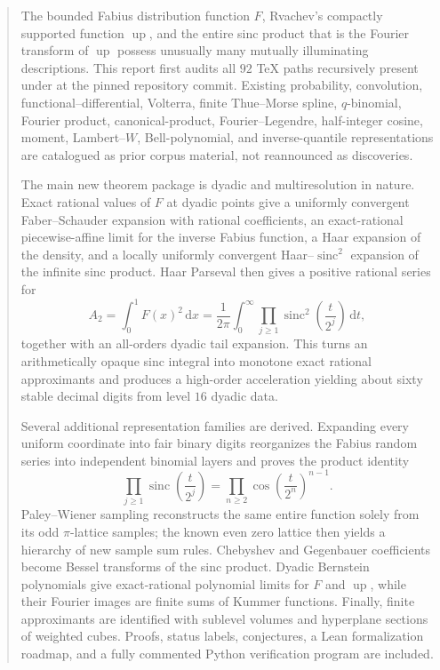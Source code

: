 \documentclass[11pt,oneside]{article}
\theoremstyle{definition}
\newcommand{\dd}{\,\mathrm d}
\newcommand{\Up}{\operatorname{up}}
\newcommand{\sinc}{\operatorname{sinc}}
\begin{document}
\begin{abstract}
The bounded Fabius distribution function $F$, Rvachev's compactly supported
function $\Up$, and the entire sinc product that is the Fourier transform of
$\Up$ possess unusually many mutually illuminating descriptions.  This report
first audits all $92$ TeX paths recursively present under
 at the pinned repository commit.  Existing
probability, convolution, functional--differential, Volterra, finite
Thue--Morse spline, $q$-binomial, Fourier product, canonical-product,
Fourier--Legendre, half-integer cosine, moment, Lambert--$W$, Bell-polynomial,
and inverse-quantile representations are catalogued as prior corpus material,
not reannounced as discoveries.

The main new theorem package is dyadic and multiresolution in nature.  Exact
rational values of $F$ at dyadic points give a uniformly convergent
Faber--Schauder expansion with rational coefficients, an exact-rational
piecewise-affine limit for the inverse Fabius function, a Haar expansion of
the density, and a locally uniformly convergent Haar--$\sinc^2$ expansion of
the infinite sinc product.  Haar Parseval then gives a positive rational series
for
\[
 A_2=\int_0^1F(x)^2\dd x
    =\frac1{2\pi}\int_0^\infty
      \prod_{j\ge1}\sinc^2\!\left(\frac{t}{2^j}\right)\dd t,
\]
together with an all-orders dyadic tail expansion.  This turns an arithmetically
opaque sinc integral into monotone exact rational approximants and produces a
high-order acceleration yielding about sixty stable decimal digits from level
$16$ dyadic data.

Several additional representation families are derived.  Expanding every
uniform coordinate into fair binary digits reorganizes the Fabius random
series into independent binomial layers and proves the product identity
\[
 \prod_{j\ge1}\sinc\!\left(\frac{t}{2^j}\right)
 =\prod_{n\ge2}\cos\!\left(\frac{t}{2^n}\right)^{n-1}.
\]
Paley--Wiener sampling reconstructs the same entire function solely from its
odd $\pi$-lattice samples; the known even zero lattice then yields a hierarchy
of new sample sum rules.  Chebyshev and Gegenbauer coefficients become
Bessel transforms of the sinc product.  Dyadic Bernstein polynomials give
exact-rational polynomial limits for $F$ and $\Up$, while their Fourier images
are finite sums of Kummer functions.  Finally, finite approximants are
identified with sublevel volumes and hyperplane sections of weighted cubes.
Proofs, status labels, conjectures, a Lean formalization roadmap, and a fully
commented Python verification program are included.
\end{abstract}
\end{document}
